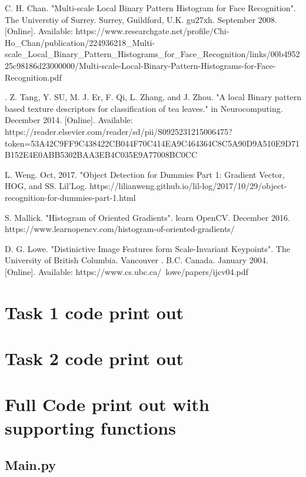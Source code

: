 \documentclass[conference]{IEEEtran}
\begin{document}
\begin{thebibliography}{00}
 C. H. Chan. "Multi-scale Local Binary Pattern Histogram for Face Recognition". The Universtiy of Surrey. Surrey, Guildford, U.K. gu27xh. September 2008. [Online]. Available: https://www.researchgate.net/profile/Chi-Ho\_Chan/publication/224936218\_Multi-scale\_Local\_Binary\_Pattern\_Histograms\_for\_Face\_Recognition/links/00b495225c98186d23000000/Multi-scale-Local-Binary-Pattern-Histograms-for-Face-Recognition.pdf


. Z. Tang, Y. SU, M. J. Er, F. Qi, L. Zhang, and J. Zhou. "A local Binary pattern based texture descriptors for classification of tea leaves." in Neurocomputing. December 2014. [Online]. Available: https://reader.elsevier.com/reader/sd/pii/S0925231215006475?token=53A42C9FF9C438422CB044F70C414EA9C464364C8C5A90D9A510E9D71B152E4E0ABB5302BAA3EB4C035E9A77008BC0CC

 L. Weng. Oct, 2017. "Object Detection for Dummies Part 1: Gradient Vector, HOG, and SS. Lil'Log. https://lilianweng.github.io/lil-log/2017/10/29/object-recognition-for-dummies-part-1.html

 S. Mallick. "Histogram of Oriented Gradients". learn OpenCV. December 2016. https://www.learnopencv.com/histogram-of-oriented-gradients/

 D. G. Lowe. "Distinictive Image Features form Scale-Invariant Keypoints". The University of British Columbia. Vancouver . B.C. Canada. January 2004. [Online]. Available: https://www.cs.ubc.ca/~lowe/papers/ijcv04.pdf
\end{thebibliography}

\appendix

\begin{appendices}
	\section{Task 1 code print out}\label{ap 1}

	\section{Task 2 code print out}
	
	\section{Full Code print out with supporting functions}
	\subsection{Main.py}
	
	
\end{appendices}

\end{document}
